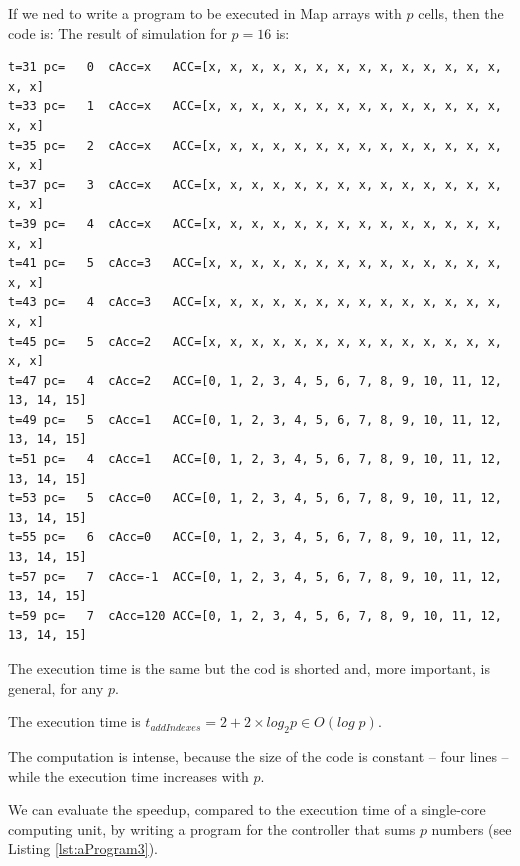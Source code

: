 \begin{exemplu}
If we ned to write a program to be executed in Map arrays with $p$ cells, then the code is:
{\em 
{}
}
The result of simulation for $p=16$ is:
{\small
\begin{verbatim}
t=31 pc=   0  cAcc=x   ACC=[x, x, x, x, x, x, x, x, x, x, x, x, x, x, x, x] 
t=33 pc=   1  cAcc=x   ACC=[x, x, x, x, x, x, x, x, x, x, x, x, x, x, x, x] 
t=35 pc=   2  cAcc=x   ACC=[x, x, x, x, x, x, x, x, x, x, x, x, x, x, x, x] 
t=37 pc=   3  cAcc=x   ACC=[x, x, x, x, x, x, x, x, x, x, x, x, x, x, x, x] 
t=39 pc=   4  cAcc=x   ACC=[x, x, x, x, x, x, x, x, x, x, x, x, x, x, x, x] 
t=41 pc=   5  cAcc=3   ACC=[x, x, x, x, x, x, x, x, x, x, x, x, x, x, x, x] 
t=43 pc=   4  cAcc=3   ACC=[x, x, x, x, x, x, x, x, x, x, x, x, x, x, x, x] 
t=45 pc=   5  cAcc=2   ACC=[x, x, x, x, x, x, x, x, x, x, x, x, x, x, x, x] 
t=47 pc=   4  cAcc=2   ACC=[0, 1, 2, 3, 4, 5, 6, 7, 8, 9, 10, 11, 12, 13, 14, 15] 
t=49 pc=   5  cAcc=1   ACC=[0, 1, 2, 3, 4, 5, 6, 7, 8, 9, 10, 11, 12, 13, 14, 15] 
t=51 pc=   4  cAcc=1   ACC=[0, 1, 2, 3, 4, 5, 6, 7, 8, 9, 10, 11, 12, 13, 14, 15] 
t=53 pc=   5  cAcc=0   ACC=[0, 1, 2, 3, 4, 5, 6, 7, 8, 9, 10, 11, 12, 13, 14, 15] 
t=55 pc=   6  cAcc=0   ACC=[0, 1, 2, 3, 4, 5, 6, 7, 8, 9, 10, 11, 12, 13, 14, 15] 
t=57 pc=   7  cAcc=-1  ACC=[0, 1, 2, 3, 4, 5, 6, 7, 8, 9, 10, 11, 12, 13, 14, 15] 
t=59 pc=   7  cAcc=120 ACC=[0, 1, 2, 3, 4, 5, 6, 7, 8, 9, 10, 11, 12, 13, 14, 15]
\end{verbatim}
}
The execution time is the same but the cod is shorted and, more important, is general, for any $p$.

The execution time is $t_{addIndexes} = 2 + 2 \times log_2 p \in O(log \; p)$.

The computation is intense, because the size of the code is constant -- four lines -- while the execution time increases with $p$.

We can evaluate the speedup, compared to the execution time of a single-core computing unit, by writing a program for the controller that sums $p$ numbers (see Listing \ref{lst:aProgram3}).


\end{exemplu}
